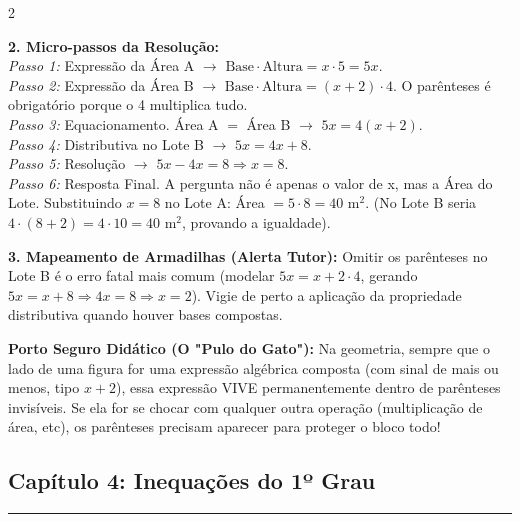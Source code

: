 \begin{multicols*}{2}
\begin{tcolorbox}[colback=CorTitUm!5, colframe=CorTitUm, boxrule=1pt, arc=4pt, left=6pt, right=6pt, top=6pt, bottom=6pt]
    \textbf{2. Micro-passos da Resolução:}\\
    \textit{Passo 1:} Expressão da Área A $\rightarrow$ $\text{Base} \cdot \text{Altura} = x \cdot 5 = 5x$.\\
    \textit{Passo 2:} Expressão da Área B $\rightarrow$ $\text{Base} \cdot \text{Altura} = (x + 2) \cdot 4$. O parênteses é obrigatório porque o 4 multiplica tudo.\\
    \textit{Passo 3:} Equacionamento. Área A $=$ Área B $\rightarrow$ $5x = 4(x + 2)$.\\
    \textit{Passo 4:} Distributiva no Lote B $\rightarrow$ $5x = 4x + 8$.\\
    \textit{Passo 5:} Resolução $\rightarrow$ $5x - 4x = 8 \Rightarrow x = 8$.\\
    \textit{Passo 6:} Resposta Final. A pergunta não é apenas o valor de x, mas a Área do Lote. Substituindo $x=8$ no Lote A: Área $= 5 \cdot 8 = 40 \text{ m}^2$. (No Lote B seria $4 \cdot (8+2) = 4 \cdot 10 = 40 \text{ m}^2$, provando a igualdade).\par\vspace{0.1cm}
    
    \textbf{3. Mapeamento de Armadilhas (Alerta Tutor):} Omitir os parênteses no Lote B é o erro fatal mais comum (modelar $5x = x + 2 \cdot 4$, gerando $5x = x + 8 \Rightarrow 4x = 8 \Rightarrow x=2$). Vigie de perto a aplicação da propriedade distributiva quando houver bases compostas.
    \end{tcolorbox}
    \vspace{0.15cm}
    
    \begin{boxexplicacao}
    \textbf{Porto Seguro Didático (O "Pulo do Gato"):} Na geometria, sempre que o lado de uma figura for uma expressão algébrica composta (com sinal de mais ou menos, tipo $x+2$), essa expressão VIVE permanentemente dentro de parênteses invisíveis. Se ela for se chocar com qualquer outra operação (multiplicação de área, etc), os parênteses precisam aparecer para proteger o bloco todo!
    \end{boxexplicacao}
\fi

\par\vspace{\espacoQuestao}
\subsection*{Capítulo 4: Inequações do 1º Grau}
\vspace{-0.2cm}\noindent\rule{\linewidth}{1.5pt} 
\par\vspace{\espacoPosTitulo}

\end{multicols*}
